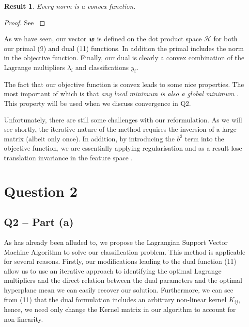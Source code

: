\documentclass{article}
\newtheorem{result}[definition]{Result}
\begin{document}
\begin{result}
        Every norm is a convex function.
\end{result} 
\begin{proof}
    See \cite{web:maths:UCL}
\end{proof}

As we have seen, our vector $\textbf{\textit{w}}$ is defined on the dot product space $\mathcal{H}$ for both our primal (9) and dual (11) functions. In addition the primal includes the norm in the objective function. Finally, our dual is clearly a convex combination of the Lagrange multipliers $\lambda_{i}$ and classifications $y_{i}$. \par

The fact that our objective function is convex leads to some nice properties. The most important of which is that \textit{any local minimum is also a global minimum} \cite{web:maths:princeton}. This property will be used when we discuss convergence in Q2.\par

Unfortunately, there are still some challenges with our reformulation. As we will see shortly, the iterative nature of the method requires the inversion of a large matrix (albeit only once). In addition, by introducing the $b^2$ term into the objective function, we are essentially applying regularisation and as a result lose translation invariance in the feature space \cite{scholkopf2002learning:ch10}.

\newpage
\section{Question 2}

\subsection*{\textbf{Q2 – Part (a)}}
As has already been alluded to, we propose the Lagrangian Support Vector Machine Algorithm \cite{mangasarian2001lagrangian} to solve our classification problem. This method is applicable for several reasons. Firstly, our modifications leading to the dual function (11) allow us to use an iterative approach to identifying the optimal Lagrange multipliers and the direct relation between the dual parameters and the optimal hyperplane mean we can easily recover our solution. Furthermore, we can see from (11) that the dual formulation includes an arbitrary non-linear kernel $K_{ij}$, hence, we need only change the Kernel matrix in our algorithm to account for non-linearity. \par
\end{document}
